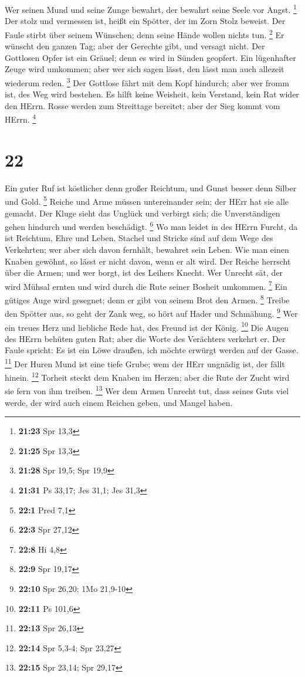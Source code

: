 Wer seinen Mund und seine Zunge bewahrt, der bewahrt seine Seele vor
Angst. \footnote{\textbf{21:23} Spr 13,3}  Der stolz und
vermessen ist, heißt ein Spötter, der im Zorn Stolz beweist.
 Der Faule stirbt über seinem Wünschen; denn seine Hände
wollen nichts tun. \footnote{\textbf{21:25} Spr 13,3}  Er
wünscht den ganzen Tag; aber der Gerechte gibt, und versagt nicht.
 Der Gottlosen Opfer ist ein Gräuel; denn es wird in
Sünden geopfert.  Ein lügenhafter Zeuge wird umkommen;
aber wer sich sagen lässt, den lässt man auch allezeit wiederum reden.
\footnote{\textbf{21:28} Spr 19,5; Spr 19,9}  Der
Gottlose fährt mit dem Kopf hindurch; aber wer fromm ist, des Weg wird
bestehen.  Es hilft keine Weisheit, kein Verstand, kein
Rat wider den HErrn.  Rosse werden zum Streittage
bereitet; aber der Sieg kommt vom HErrn. \footnote{\textbf{21:31} Ps
  33,17; Jes 31,1; Jes 31,3}

\hypertarget{section-21}{%
\section{22}\label{section-21}}

 Ein guter Ruf ist köstlicher denn großer Reichtum, und
Gunst besser denn Silber und Gold. \footnote{\textbf{22:1} Pred 7,1}
 Reiche und Arme müssen untereinander sein; der HErr hat
sie alle gemacht.  Der Kluge sieht das Unglück und
verbirgt sich; die Unverständigen gehen hindurch und werden beschädigt.
\footnote{\textbf{22:3} Spr 27,12}  Wo man leidet in des
HErrn Furcht, da ist Reichtum, Ehre und Leben.  Stachel
und Stricke sind auf dem Wege des Verkehrten; wer aber sich davon
fernhält, bewahret sein Leben.  Wie man einen Knaben
gewöhnt, so lässt er nicht davon, wenn er alt wird.  Der
Reiche herrscht über die Armen; und wer borgt, ist des Leihers Knecht.
 Wer Unrecht sät, der wird Mühsal ernten und wird durch
die Rute seiner Bosheit umkommen. \footnote{\textbf{22:8} Hi 4,8}
 Ein gütiges Auge wird gesegnet; denn er gibt von seinem
Brot den Armen. \footnote{\textbf{22:9} Spr 19,17} 
Treibe den Spötter aus, so geht der Zank weg, so hört auf Hader und
Schmähung. \footnote{\textbf{22:10} Spr 26,20; 1Mo 21,9-10}
 Wer ein treues Herz und liebliche Rede hat, des Freund
ist der König. \footnote{\textbf{22:11} Ps 101,6}  Die
Augen des HErrn behüten guten Rat; aber die Worte des Verächters
verkehrt er.  Der Faule spricht: Es ist ein Löwe draußen,
ich möchte erwürgt werden auf der Gasse. \footnote{\textbf{22:13} Spr
  26,13}  Der Huren Mund ist eine tiefe Grube; wem der
HErr ungnädig ist, der fällt hinein. \footnote{\textbf{22:14} Spr 5,3-4;
  Spr 23,27}  Torheit steckt dem Knaben im Herzen; aber
die Rute der Zucht wird sie fern von ihm treiben. \footnote{\textbf{22:15}
  Spr 23,14; Spr 29,17}  Wer dem Armen Unrecht tut, dass
seines Guts viel werde, der wird auch einem Reichen geben, und Mangel
haben.

